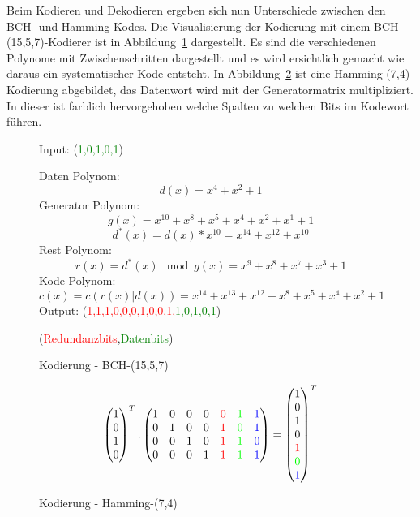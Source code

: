 Beim Kodieren und Dekodieren ergeben sich nun Unterschiede zwischen den BCH- und Hamming-Kodes. Die Visualisierung der Kodierung mit einem BCH-(15,5,7)-Kodierer ist in Abbildung~\ref{fig:enc_bch} dargestellt. Es sind die verschiedenen Polynome mit Zwischenschritten dargestellt und es wird ersichtlich gemacht wie daraus ein systematischer Kode entsteht. In Abbildung~\ref{fig:enc_hamming} ist eine Hamming-(7,4)-Kodierung abgebildet, das Datenwort wird mit der Generatormatrix multipliziert. In dieser ist farblich hervorgehoben welche Spalten zu welchen Bits im Kodewort führen.

\begin{figure}
Input: (\textcolor{green}{1,0,1,0,1})

Daten Polynom: \[d(x) = x^{4} + x^{2} + 1\] Generator Polynom:
\[g(x) = x^{10} + x^{8} + x^{5} + x^{4} + x^{2} + x^{1} + 1\]
\[ d^*(x) = d(x)*x^{10} = x^{14} + x^{12} + x^{10}\] Rest Polynom:
\[r(x) = d^*(x)\mod g(x) = x^{9} + x^{8} + x^{7} + x^{3} + 1\] Kode
Polynom:
\[c(x) = c( r(x)|d(x) ) = x^{14} + x^{13} + x^{12} + x^{8} + x^{5} + x^{4} + x^{2} + 1\]
Output:
(\textcolor{red}{1,1,1,0,0,0,1,0,0,1,}\textcolor{green}{1,0,1,0,1})

(\textcolor{red}{Redundanzbits},\textcolor{green}{Datenbits})

\caption{Kodierung - BCH-(15,5,7)}
\label{fig:enc_bch}
\end{figure}

\begin{figure}[!h]
\[\begin{pmatrix}1\\0\\1\\0\\ \end{pmatrix}^T. \begin{pmatrix}1&0&0&0&\textcolor{red}{0}&\textcolor{green}{1}&\textcolor{blue}{1}\\0&1&0&0&\textcolor{red}{1}&\textcolor{green}{0}&\textcolor{blue}{1}\\0&0&1&0&\textcolor{red}{1}&\textcolor{green}{1}&\textcolor{blue}{0}\\0&0&0&1&\textcolor{red}{1}&\textcolor{green}{1}&\textcolor{blue}{1}\end{pmatrix} = \begin{pmatrix}1\\0\\1\\0\\\textcolor{red}{1}\\\textcolor{green}{0}\\\textcolor{blue}{1}\\ \end{pmatrix}^T\]

\caption{Kodierung - Hamming-(7,4)}
\label{fig:enc_hamming}
\end{figure}

